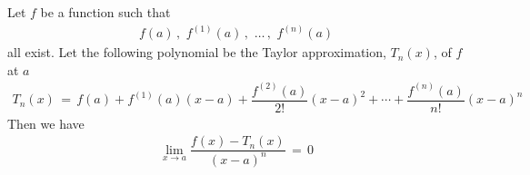 \begin{theorem}
    Let $f$ be a function such that 
    \begin{align*}
        f(a) \hspace{2pt} , \hspace{4pt} f^{(1)}(a) \hspace{2pt} , \hspace{4pt} \dots \hspace{2pt} , \hspace{4pt} f^{(n)}(a)
    \end{align*}
    all exist. Let the following polynomial be the Taylor approximation, $T_{n}(x)$, of $f$ at $a$
    \begin{align*}
        T_{n}(x) \hspace{2pt} = \hspace{2pt} f(a) + f^{(1)}(a)(x - a) + \dfrac{f^{(2)}(a)}{2!}(x - a)^{2} + \cdots + \dfrac{f^{(n)}(a)}{n!}(x - a)^{n}
    \end{align*}
    Then we have
    \begin{align*}
        \lim_{x \longrightarrow a} \dfrac{f(x) - T_{n}(x)}{(x - a)^{n}} \hspace{2pt} = \hspace{2pt} 0
    \end{align*}
\end{theorem}

